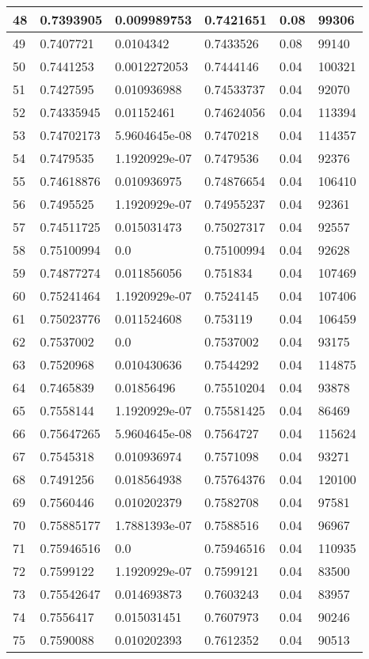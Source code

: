 \begin{longtable}{|l|l|l|l|l|l|}
48 & 0.7393905 & 0.009989753 & 0.7421651 & 0.08 & 99306 \\ \hline 
49 & 0.7407721 & 0.0104342 & 0.7433526 & 0.08 & 99140 \\ \hline 
50 & 0.7441253 & 0.0012272053 & 0.7444146 & 0.04 & 100321 \\ \hline 
51 & 0.7427595 & 0.010936988 & 0.74533737 & 0.04 & 92070 \\ \hline 
52 & 0.74335945 & 0.01152461 & 0.74624056 & 0.04 & 113394 \\ \hline 
53 & 0.74702173 & 5.9604645e-08 & 0.7470218 & 0.04 & 114357 \\ \hline 
54 & 0.7479535 & 1.1920929e-07 & 0.7479536 & 0.04 & 92376 \\ \hline 
55 & 0.74618876 & 0.010936975 & 0.74876654 & 0.04 & 106410 \\ \hline 
56 & 0.7495525 & 1.1920929e-07 & 0.74955237 & 0.04 & 92361 \\ \hline 
57 & 0.74511725 & 0.015031473 & 0.75027317 & 0.04 & 92557 \\ \hline 
58 & 0.75100994 & 0.0 & 0.75100994 & 0.04 & 92628 \\ \hline 
59 & 0.74877274 & 0.011856056 & 0.751834 & 0.04 & 107469 \\ \hline 
60 & 0.75241464 & 1.1920929e-07 & 0.7524145 & 0.04 & 107406 \\ \hline 
61 & 0.75023776 & 0.011524608 & 0.753119 & 0.04 & 106459 \\ \hline 
62 & 0.7537002 & 0.0 & 0.7537002 & 0.04 & 93175 \\ \hline 
63 & 0.7520968 & 0.010430636 & 0.7544292 & 0.04 & 114875 \\ \hline 
64 & 0.7465839 & 0.01856496 & 0.75510204 & 0.04 & 93878 \\ \hline 
65 & 0.7558144 & 1.1920929e-07 & 0.75581425 & 0.04 & 86469 \\ \hline 
66 & 0.75647265 & 5.9604645e-08 & 0.7564727 & 0.04 & 115624 \\ \hline 
67 & 0.7545318 & 0.010936974 & 0.7571098 & 0.04 & 93271 \\ \hline 
68 & 0.7491256 & 0.018564938 & 0.75764376 & 0.04 & 120100 \\ \hline 
69 & 0.7560446 & 0.010202379 & 0.7582708 & 0.04 & 97581 \\ \hline 
70 & 0.75885177 & 1.7881393e-07 & 0.7588516 & 0.04 & 96967 \\ \hline 
71 & 0.75946516 & 0.0 & 0.75946516 & 0.04 & 110935 \\ \hline 
72 & 0.7599122 & 1.1920929e-07 & 0.7599121 & 0.04 & 83500 \\ \hline 
73 & 0.75542647 & 0.014693873 & 0.7603243 & 0.04 & 83957 \\ \hline 
74 & 0.7556417 & 0.015031451 & 0.7607973 & 0.04 & 90246 \\ \hline 
75 & 0.7590088 & 0.010202393 & 0.7612352 & 0.04 & 90513 \\ \hline 
\end{longtable}